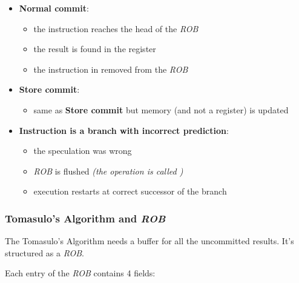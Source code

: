 \documentclass[english]{article}
\begin{document}
\begin{itemize}
  \item \textbf{Normal commit}:
        \begin{itemize}
          \item the instruction reaches the head of the \textit{ROB}
          \item the result is found in the register
          \item the instruction in removed from the \textit{ROB}
        \end{itemize}
  \item \textbf{Store commit}:
        \begin{itemize}
          \item same as \textbf{Store commit} but memory (and not a register) is updated
        \end{itemize}
  \item \textbf{Instruction is a branch with incorrect prediction}:
        \begin{itemize}
          \item the speculation was wrong
          \item \textit{ROB} is flushed \textit{(the operation is called )}
          \item execution restarts at correct successor of the branch
        \end{itemize}
\end{itemize}

\subsubsection{Tomasulo's Algorithm and \textit{ROB}}

The Tomasulo's Algorithm needs a buffer for all the uncommitted results.
It's structured as a \textit{ROB}.

Each entry of the \textit{ROB} contains 4 fields:
\end{document}
